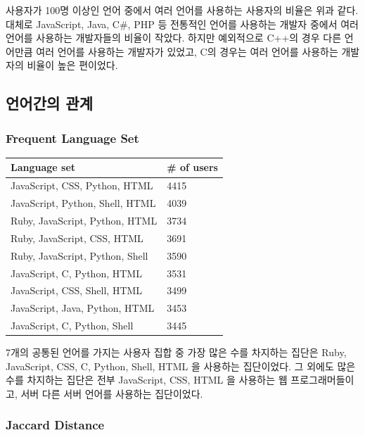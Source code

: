\documentclass[10pt, a4paper, titlepage]{article}
\begin{document}
사용자가 100명 이상인 언어 중에서 여러 언어를 사용하는 사용자의 비율은 위과 같다. 대체로 JavaScript, Java, C\#, PHP 등 전통적인 언어를 사용하는 개발자 중에서 여러 언어를 사용하는 개발자들의 비율이 작았다. 하지만 예외적으로 C++의 경우 다른 언어만큼 여러 언어를 사용하는 개발자가 있었고, C의 경우는 여러 언어를 사용하는 개발자의 비율이 높은 편이었다.

\subsection{언어간의 관계}

\subsubsection{Frequent Language Set}

\begin{longtable}{|l|l|}
\hline
\rowcolor[gray]{0.8}
Language set & \# of users \\
\hline

JavaScript, CSS, Python, HTML &
4415 \\ \hline
JavaScript, Python, Shell, HTML &
4039 \\ \hline
Ruby, JavaScript, Python, HTML &
3734 \\ \hline
Ruby, JavaScript, CSS, HTML &
3691 \\ \hline
Ruby, JavaScript, Python, Shell &
3590 \\ \hline
JavaScript, C, Python, HTML &
3531 \\ \hline
JavaScript, CSS, Shell, HTML &
3499 \\ \hline
JavaScript, Java, Python, HTML &
3453 \\ \hline
JavaScript, C, Python, Shell &
3445 \\ \hline

\end{longtable}

7개의 공통된 언어를 가지는 사용자 집합 중 가장 많은 수를 차지하는 집단은 Ruby, JavaScript, CSS, C, Python, Shell, HTML 을 사용하는 집단이었다. 그 외에도 많은 수를 차지하는 집단은 전부 JavaScript, CSS, HTML 을 사용하는 웹 프로그래머들이고, 서버 다른 서버 언어를 사용하는 집단이었다.

\subsubsection{Jaccard Distance}
\end{document}
